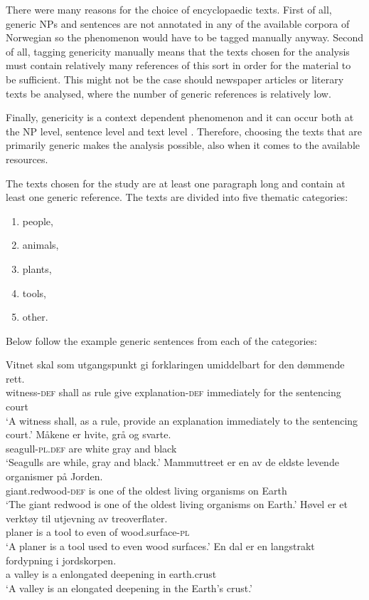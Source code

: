 \documentclass[output=paper]{langsci/langscibook}
\begin{document}
There were many reasons for the choice of encyclopaedic texts. First of all, generic NPs and sentences are not annotated in any of the available corpora of Norwegian so the phenomenon would have to be tagged manually anyway. Second of all, tagging genericity manually means that the texts chosen for the analysis must contain relatively many references of this sort in order for the material to be sufficient. This might not be the case should newspaper articles or literary texts be analysed, where the number of generic references is relatively low.

Finally, genericity is a context dependent phenomenon and it can occur both at the NP level, sentence level and text level \citep{Behrens2005}. Therefore, choosing the texts that are primarily generic makes the analysis possible, also when it comes to the available resources.

The texts chosen for the study are at least one paragraph long and contain at least one generic reference. The texts are divided into five thematic categories:

\begin{enumerate}
    \item people,
    \item animals,
    \item plants,
    \item tools,
    \item other.
\end{enumerate}

Below follow the example generic sentences from each of the categories:

\ea\label{ex:corpus1}
	\gll Vitnet skal som utgangspunkt gi forklaringen umiddelbart for den dømmende rett. \\
		 witness-\textsc{def} shall as rule give explanation-\textsc{def} immediately for the sentencing court \\
	\glt `A witness shall, as a rule, provide an explanation immediately to the sentencing court.'
\ex\label{ex:corpus2}
	\gll Måkene er hvite, grå og svarte. \\
		 seagull-\textsc{pl}.\textsc{def} are white gray and black \\
	\glt `Seagulls are while, gray and black.'
\ex\label{ex:corpus3}
	\gll Mammuttreet er en av de eldste levende organismer på Jorden. \\
		 giant.redwood-\textsc{def} is one of the oldest living organisms on Earth \\
	\glt `The giant redwood is one of the oldest living organisms on Earth.'
\ex\label{ex:corpus4}
	\gll Høvel er et verktøy til utjevning av treoverflater. \\
		 planer is a tool to even of wood.surface-\textsc{pl} \\
	\glt `A planer is a tool used to even wood surfaces.'
\ex\label{ex:corpus5}
	\gll En dal er en langstrakt fordypning i jordskorpen. \\
		 a valley is a enlongated deepening in earth.crust \\
	\glt `A valley is an elongated deepening in the Earth's crust.'
\z
\end{document}

